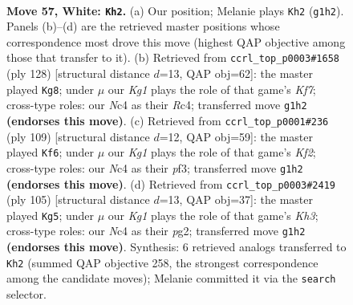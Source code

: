 \documentclass[11pt]{article}
\begin{document}
\clearpage

\begin{figure}[p]\centering
\begin{subfigure}{0.46\textwidth}\centering
\resizebox{\linewidth}{!}{%
\newchessgame
\chessboard[
  setfen={1R6/6p1/5pk1/7p/2NP3P/6P1/8/r5K1 w - - 7 57},
  showmover=false,
  pgfstyle=straightmove, color=movearrow, markmove={g1-h2}
]}
\caption{}
\end{subfigure}\hfill
\begin{subfigure}{0.46\textwidth}\centering
\resizebox{\linewidth}{!}{%
\newchessgame
\chessboard[
  setfen={8/r4K2/7p/6pk/2R3p1/6P1/5P1P/8 w - - 1 65},
  showmover=false,
  pgfstyle=straightmove, color=movearrow, markmove={f7-g8}
]}
\caption{}
\end{subfigure}
\\[4pt]
\begin{subfigure}{0.46\textwidth}\centering
\resizebox{\linewidth}{!}{%
\newchessgame
\chessboard[
  setfen={8/R4k2/6p1/4p2p/4P2P/5PK1/6P1/2r5 b - - 30 55},
  showmover=false,
  pgfstyle=straightmove, color=movearrow, markmove={f7-f6}
]}
\caption{}
\end{subfigure}\hfill
\begin{subfigure}{0.46\textwidth}\centering
\resizebox{\linewidth}{!}{%
\newchessgame
\chessboard[
  setfen={8/3r4/4R2k/7p/1p4p1/1P4P1/P5PK/8 b - - 10 53},
  showmover=false,
  pgfstyle=straightmove, color=movearrow, markmove={h6-g5}
]}
\caption{}
\end{subfigure}
\caption{\textbf{Move 57, White: \texttt{Kh2}.} (a) Our position; Melanie plays \texttt{Kh2} (\texttt{g1h2}). Panels (b)--(d) are the retrieved master positions whose correspondence most drove this move (highest QAP objective among those that transfer to it). (b) Retrieved from \texttt{ccrl\_top\_p0003\#1658} (ply 128) [structural distance $d$=13, QAP obj=62]: the master played \texttt{Kg8}; under $\mu$ our \emph{Kg1} plays the role of that game's \emph{Kf7}; cross-type roles: our \emph{N}c4 as their \emph{R}c4; transferred move \texttt{g1h2} \textbf{(endorses this move)}. (c) Retrieved from \texttt{ccrl\_top\_p0001\#236} (ply 109) [structural distance $d$=12, QAP obj=59]: the master played \texttt{Kf6}; under $\mu$ our \emph{Kg1} plays the role of that game's \emph{Kf2}; cross-type roles: our \emph{N}c4 as their \emph{p}f3; transferred move \texttt{g1h2} \textbf{(endorses this move)}. (d) Retrieved from \texttt{ccrl\_top\_p0003\#2419} (ply 105) [structural distance $d$=13, QAP obj=37]: the master played \texttt{Kg5}; under $\mu$ our \emph{Kg1} plays the role of that game's \emph{Kh3}; cross-type roles: our \emph{N}c4 as their \emph{p}g2; transferred move \texttt{g1h2} \textbf{(endorses this move)}. Synthesis: 6 retrieved analogs transferred to \texttt{Kh2} (summed QAP objective 258, the strongest correspondence among the candidate moves); Melanie committed it via the \texttt{search} selector.}
\label{fig:thought-m112}
\end{figure}
\end{document}
